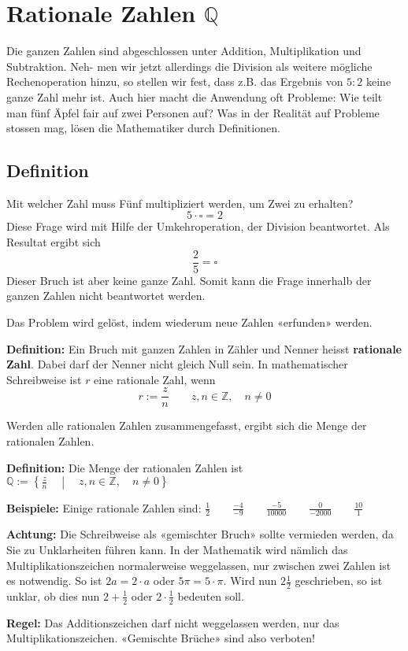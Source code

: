 \newpage
\section{Rationale Zahlen $\mathbb{Q}$}

Die ganzen Zahlen sind abgeschlossen unter Addition, Multiplikation und Subtraktion. Neh- men wir jetzt allerdings die Division als weitere mögliche Rechenoperation hinzu, so stellen wir fest, dass z.B. das Ergebnis von $5:2$ keine ganze Zahl mehr ist. Auch hier macht die Anwendung oft Probleme: Wie teilt man fünf Äpfel fair auf zwei Personen auf? Was in der Realität auf Probleme stossen mag, lösen die Mathematiker durch Definitionen.

\subsection{Definition}

Mit welcher Zahl muss Fünf multipliziert werden, um Zwei zu erhalten?
\[
  5\cdot\square = 2
\]
Diese Frage wird mit Hilfe der Umkehroperation, der Division beantwortet. Als Resultat ergibt sich
\[
  \frac{2}{5} = \square
\]
Dieser Bruch ist aber keine ganze Zahl. Somit kann die Frage innerhalb der ganzen Zahlen nicht beantwortet werden.

Das Problem wird gelöst, indem wiederum neue Zahlen «erfunden» werden.

\textbf{Definition:} Ein Bruch mit ganzen Zahlen in Zähler und Nenner heisst \textbf{rationale Zahl}. Dabei darf der Nenner nicht gleich Null sein. In mathematischer Schreibweise ist $r$ eine rationale Zahl, wenn
  \[
    r := \frac{z}{n} \qquad z,n \in \mathbb{Z},\quad n \ne 0
  \]

Werden alle rationalen Zahlen zusammengefasst, ergibt sich die Menge der rationalen Zahlen.

\textbf{Definition:} Die Menge der rationalen Zahlen ist $\displaystyle \mathbb{Q} := \left\{ \frac{z}{n} \quad \middle| \quad z,n \in \mathbb{Z}, \quad n \ne 0 \right\}$

\begin{example}
  \textbf{Beispiele:} Einige rationale Zahlen sind: $\displaystyle \frac{1}{2} \qquad \frac{-4}{-9} \qquad \frac{-5}{10000} \qquad \frac{0}{-2000} \qquad \frac{10}{1}$
\end{example}
\begin{note}
  \textbf{Achtung:} Die Schreibweise als «gemischter Bruch» sollte vermieden werden, da Sie zu Unklarheiten führen kann. In der Mathematik wird nämlich das Multiplikationszeichen normalerweise weggelassen, nur zwischen zwei Zahlen ist es notwendig. So ist $2a = 2\cdot a$ oder $5\pi = 5\cdot\pi$. Wird nun $2\frac{1}{2}$ geschrieben, so ist unklar, ob dies nun $2+\frac{1}{2}$ oder $2\cdot\frac{1}{2}$ bedeuten soll.

  \textbf{Regel:} Das Additionszeichen darf nicht weggelassen werden, nur das Multiplikationszeichen. «Gemischte Brüche» sind also verboten!
\end{note}

